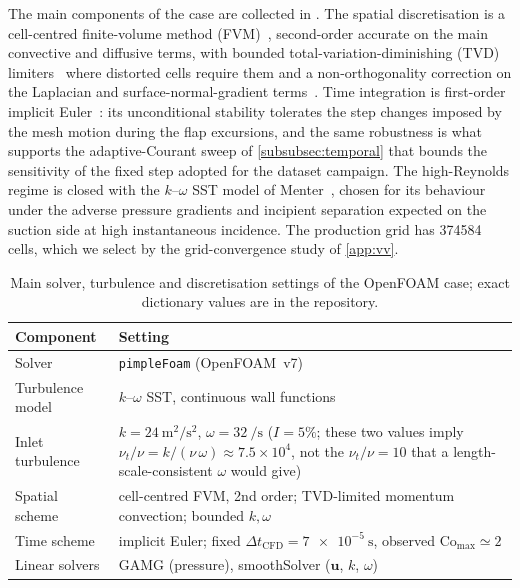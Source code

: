 The main components of the case are collected in . The spatial discretisation is a cell-centred finite-volume method (FVM)~\cite{ferziger2002cfd}, second-order accurate on the main convective and diffusive terms, with bounded total-variation-diminishing (TVD) limiters~\cite{sweby1984limiters} where distorted cells require them and a non-orthogonality correction on the Laplacian and surface-normal-gradient terms~\cite{jasak1996error}. Time integration is first-order implicit Euler~\cite{ferziger2002cfd}: its unconditional stability tolerates the step changes imposed by the mesh motion during the flap excursions, and the same robustness is what supports the adaptive-Courant sweep of \cref{subsubsec:temporal} that bounds the sensitivity of the fixed step adopted for the dataset campaign. The high-Reynolds regime is closed with the $k$--$\omega$ SST model of Menter~\cite{menter1994sst}, chosen for its behaviour under the adverse pressure gradients and incipient separation expected on the suction side at high instantaneous incidence. The production grid has \num{374584} cells, which we select by the grid-convergence study of \cref{app:vv}.

\begin{table}[t]
    \centering
    \begin{tabular}{|p{}|p{}|}
    \hline
    \rowcolor{bluePoli!40}
    Component & Setting \T\B \\
    \hline\hline
    Solver & \texttt{pimpleFoam} (OpenFOAM~v7) \T\B \\
    Turbulence model & $k$--$\omega$ SST, continuous wall functions \T\B \\
    Inlet turbulence & $k = \SI{24}{\meter\squared\per\second\squared}$, $\omega = \SI{32}{\per\second}$ ($I = 5\%$; these two values imply $\nu_t/\nu = k/(\nu\,\omega) \approx 7.5\times10^{4}$, not the $\nu_t/\nu=10$ that a length-scale-consistent $\omega$ would give) \T\B \\
    Spatial scheme & cell-centred FVM, 2nd order; TVD-limited momentum convection; bounded $k,\omega$ \T\B \\
    Time scheme & implicit Euler; fixed $\Delta t_{\mathrm{CFD}} = \SI{7e-5}{\second}$, observed $\mathrm{Co}_{\max} \simeq 2$ \T\B \\
    Linear solvers & GAMG (pressure), smoothSolver ($\mathbf u$, $k$, $\omega$) \B \\
    \hline
    \end{tabular}
    \\[6pt]
    \caption{Main solver, turbulence and discretisation settings of the OpenFOAM case; exact dictionary values are in the repository.}
    \label{tab:cfd_setup}
\end{table}

